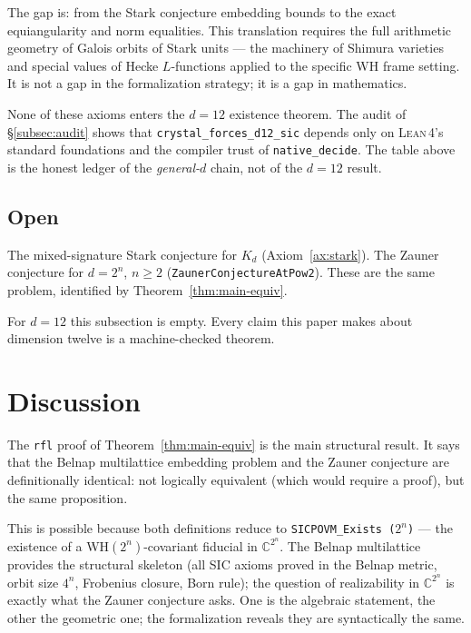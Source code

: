\documentclass[12pt,a4paper]{article}
\newcommand{\Kd}{K_d}
\newcommand{\Lean}{\textsc{Lean\,4}}
\begin{document}
The gap is: from the Stark conjecture embedding bounds to the exact
equiangularity and norm equalities.  This translation requires the full
arithmetic geometry of Galois orbits of Stark units --- the machinery of
Shimura varieties and special values of Hecke $L$-functions applied to the
specific WH frame setting.  It is not a gap in the formalization strategy;
it is a gap in mathematics.

None of these axioms enters the $d = 12$ existence theorem.  The audit of
\S\ref{subsec:audit} shows that \texttt{crystal\_forces\_d12\_sic} depends
only on \Lean{}'s standard foundations and the compiler trust of
\texttt{native\_decide}.  The table above is the honest ledger of the
\emph{general-$d$} chain, not of the $d = 12$ result.

\subsection{Open}

The mixed-signature Stark conjecture for $\Kd$ (Axiom~\ref{ax:stark}).
The Zauner conjecture for $d = 2^n$, $n \geq 2$ (\texttt{ZaunerConjectureAtPow2}).
These are the same problem, identified by Theorem~\ref{thm:main-equiv}.

For $d = 12$ this subsection is empty.  Every claim this paper makes about
dimension twelve is a machine-checked theorem.

\section{Discussion}
\label{sec:disc}

The \texttt{rfl} proof of Theorem~\ref{thm:main-equiv} is the main structural
result.  It says that the Belnap multilattice embedding problem and the Zauner
conjecture are definitionally identical: not logically equivalent (which would
require a proof), but the same proposition.

This is possible because both definitions reduce to \texttt{SICPOVM\_Exists~($2^n$)}
--- the existence of a WH$(2^n)$-covariant fiducial in $\mathbb{C}^{2^n}$.
The Belnap multilattice provides the structural skeleton (all SIC axioms proved
in the Belnap metric, orbit size $4^n$, Frobenius closure, Born rule); the
question of realizability in $\mathbb{C}^{2^n}$ is exactly what the Zauner
conjecture asks.  One is the algebraic statement, the other the geometric
one; the formalization reveals they are syntactically the same.
\end{document}
